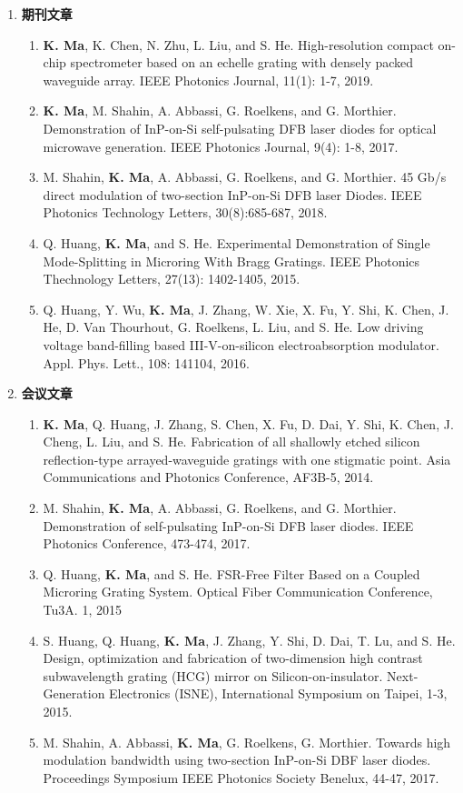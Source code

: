 \begin{publications}
\begin{enumerate}[]
	\item \textbf{期刊文章}
	\begin{enumerate}[1.]
		\item \textbf{K. Ma}, K. Chen, N. Zhu, L. Liu, and S. He. High-resolution compact on-chip spectrometer based on an echelle grating with densely packed waveguide array. IEEE Photonics Journal, 11(1): 1-7, 2019.
		\item \textbf{K. Ma}, M. Shahin, A. Abbassi, G. Roelkens, and G. Morthier. Demonstration of InP-on-Si self-pulsating DFB laser diodes for optical microwave generation. IEEE Photonics Journal, 9(4): 1-8, 2017.
		\item M. Shahin, \textbf{K. Ma}, A. Abbassi, G. Roelkens, and G. Morthier. 45 Gb/s direct modulation of two-section InP-on-Si DFB laser Diodes. IEEE Photonics Technology Letters, 30(8):685-687, 2018.
		\item Q. Huang, \textbf{K. Ma}, and S. He. Experimental Demonstration of Single Mode-Splitting in Microring With Bragg Gratings. IEEE Photonics Thechnology Letters, 27(13): 1402-1405, 2015.
		\item Q. Huang, Y. Wu, \textbf{K. Ma}, J. Zhang, W. Xie, X. Fu, Y. Shi, K. Chen, J. He, D. Van Thourhout, G. Roelkens, L. Liu, and S. He. Low driving voltage band-filling based III-V-on-silicon electroabsorption modulator. Appl. Phys. Lett., 108: 141104, 2016.
		\end{enumerate}
	\item \textbf{会议文章}
	\begin{enumerate}[1.]
		\item \textbf{K. Ma}, Q. Huang, J. Zhang, S. Chen, X. Fu, D. Dai, Y. Shi, K. Chen, J. Cheng, L. Liu, and S. He. Fabrication of all shallowly etched silicon reflection-type arrayed-waveguide gratings with one stigmatic point. Asia Communications and Photonics Conference, AF3B-5, 2014.
		\item M. Shahin, \textbf{K. Ma}, A. Abbassi, G. Roelkens, and G. Morthier. Demonstration of self-pulsating InP-on-Si DFB laser diodes. IEEE Photonics Conference, 473-474, 2017.
		\item Q. Huang, \textbf{K. Ma}, and S. He. FSR-Free Filter Based on a Coupled Microring Grating System. Optical Fiber Communication Conference, Tu3A. 1, 2015 
		\item S. Huang, Q. Huang, \textbf{K. Ma}, J. Zhang, Y. Shi, D. Dai, T. Lu, and S. He. Design, optimization and fabrication of two-dimension high contrast subwavelength grating (HCG) mirror on Silicon-on-insulator. Next-Generation Electronics (ISNE), International Symposium on Taipei, 1-3, 2015.
		\item M. Shahin, A. Abbassi, \textbf{K. Ma}, G. Roelkens, G. Morthier. Towards high modulation bandwidth using two-section InP-on-Si DBF laser diodes. Proceedings Symposium IEEE Photonics Society Benelux, 44-47, 2017.
		\end{enumerate}
\end{enumerate}
\end{publications}
